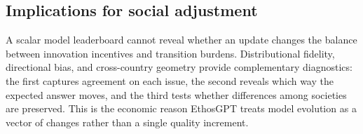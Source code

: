 \subsection{Implications for social adjustment}
A scalar model leaderboard cannot reveal whether an update changes the balance between
innovation incentives and transition burdens. Distributional fidelity, directional
bias, and cross-country geometry provide complementary diagnostics: the first captures
agreement on each issue, the second reveals which way the expected answer moves, and the
third tests whether differences among societies are preserved. This is the economic
reason EthosGPT treats model evolution as a vector of changes rather than a single
quality increment.
\FloatBarrier
